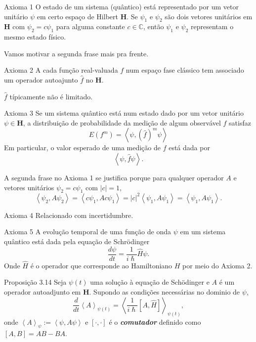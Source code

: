 \begin{thing1}{Axioma 1}\leavevmode
	O estado de um sistema (quântico) está representado por um vetor unitário $\psi$ em certo espaço de Hilbert $\mathbf{H}$. Se $\psi_1$ e $\psi_2$ são dois vetores unitários em $\mathbf{H}$ com $\psi_2=c\psi_1$ para alguma constante $c \in \mathbb{C}$, então $\psi_1$ e $\psi_2$ representam o mesmo estado físico.
\end{thing1}

Vamos motivar a segunda frase mais pra frente.

\begin{thing1}{Axioma 2}\leavevmode
	A cada função real-valuada $f$ num espaço fase clássico tem associado um operador autoajunto $\hat{f}$ no $\mathbf{H}$.
\end{thing1}

\begin{remark}\leavevmode
	$\hat{f}$ típicamente não é limitado.
\end{remark}

\begin{thing1}{Axioma 3}\leavevmode
	Se um sistema quântico está num estado dado por um vetor unitário  $\psi \in \mathbf{H}$, a distribuição de probabilidade da medição de algum observável $f$ satisfaz
	\[E(f^m)=\left<\psi,(\hat{f})^m\psi\right>\]
	Em particular, o valor esperado de uma medição de $f$ está dada por
	\[\left<\psi,\hat{f}\psi\right>.\]
\end{thing1}

A segunda frase no Axioma 1 se justifica porque para qualquer operador $A$ e vetores unitários $\psi_2=c\psi_1$ com $|c|=1$,
\[\left<\psi_2,A\psi_2\right>=\left<c\psi_1,Ac\psi_1\right>=|c|^2\left<\psi_1,A\psi_1\right>=\left<\psi_1,A\psi_1\right>.\]

\begin{thing1}{Axioma 4}\leavevmode
	Relacionado com incertidumbre.
\end{thing1}

\begin{thing1}{Axioma 5}\leavevmode
	A evolução temporal de uma função de onda $\psi$ em um sistema quântico está dada pela equação de Schrödinger
	\[\frac{d\psi}{dt}=\frac{1}{i\hslash}\hat{H}\psi.\]
	Onde $\hat{H}$ é o operador que corresponde ao Hamiltoniano $H$ por meio do Axioma 2.
\end{thing1}

\begin{thing3}{Proposição 3.14}\leavevmode
	Seja $\psi(t)$ uma solução à equação de Schödinger e $A$ é um operador autoadjunto em $\mathbf{H}$. Supondo as condições necessárias no dominio de $\psi$,
	\[\frac{d}{dt}\left<A\right>_{\psi(t)}=\left<\frac{1}{i \hslash}[A,\hat{H}]\right>_{\psi(t)},\]
	onde $\left<A\right>_{\psi}:=\left<\psi,A\psi\right>$ e $[\cdot,\cdot]$ é o \textit{\textbf{comutador}} definido como  $[A,B]=AB-BA$.
\end{thing3}

